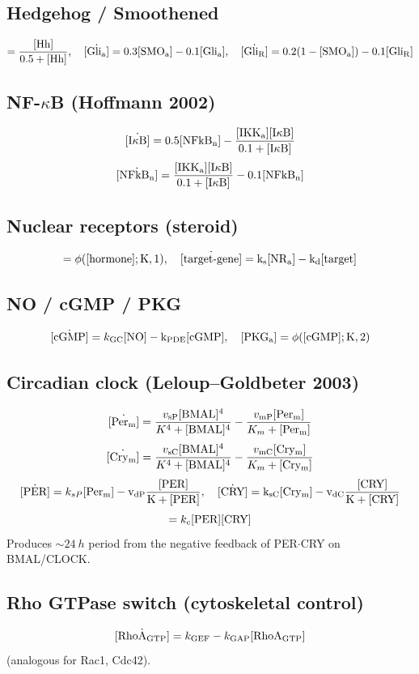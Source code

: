 \documentclass[11pt,a4paper]{article}
\newcommand{\eq}[1]{\begin{equation}#1\end{equation}}
\begin{document}
\subsection{Hedgehog / Smoothened}
\eq{ [\rm SMO_a]=\frac{[\rm Hh]}{0.5+[\rm Hh]},\quad \dot{[\rm Gli_a]}=0.3[\rm SMO_a]-0.1[\rm Gli_a],\quad \dot{[\rm Gli_R]}=0.2(1-[\rm SMO_a])-0.1[\rm Gli_R] }

\subsection{NF-$\kappa$B (Hoffmann 2002)}
\eq{ \dot{[\rm I\kappa B]}=0.5[\rm NFkB_n] - \frac{[\rm IKK_a][\rm I\kappa B]}{0.1+[\rm I\kappa B]} }
\eq{ \dot{[\rm NFkB_n]}=\frac{[\rm IKK_a][\rm I\kappa B]}{0.1+[\rm I\kappa B]} - 0.1[\rm NFkB_n] }

\subsection{Nuclear receptors (steroid)}
\eq{ [\rm NR_a]=\phi([\rm hormone]; K, 1),\quad \dot{[\rm target\text{-}gene]}=k_{\rm s}[\rm NR_a]-k_{\rm d}[\rm target] }

\subsection{NO / cGMP / PKG}
\eq{ \dot{[\rm cGMP]}=k_{\rm GC}[\rm NO]-k_{\rm PDE}[\rm cGMP],\quad [\rm PKG_a]=\phi([\rm cGMP];K,2) }

\subsection{Circadian clock (Leloup--Goldbeter 2003)}
\eq{ \dot{[\rm Per_m]} = \frac{v_{\rm sP}[\rm BMAL]^4}{K^4+[\rm BMAL]^4} - \frac{v_{\rm mP}[\rm Per_m]}{K_m+[\rm Per_m]} }
\eq{ \dot{[\rm Cry_m]} = \frac{v_{\rm sC}[\rm BMAL]^4}{K^4+[\rm BMAL]^4} - \frac{v_{\rm mC}[\rm Cry_m]}{K_m+[\rm Cry_m]} }
\eq{ \dot{[\rm PER]}=k_{sP}[\rm Per_m] - v_{dP}\frac{[\rm PER]}{K+[\rm PER]},\quad \dot{[\rm CRY]}=k_{sC}[\rm Cry_m]-v_{dC}\frac{[\rm CRY]}{K+[\rm CRY]} }
\eq{ [\rm PER\!\cdot\!CRY]=k_c[\rm PER][\rm CRY] }
Produces $\sim\SI{24}{h}$ period from the negative feedback of PER$\cdot$CRY on BMAL/CLOCK.

\subsection{Rho GTPase switch (cytoskeletal control)}
\eq{ \dot{[\rm RhoA_{GTP}]} = k_{\rm GEF} - k_{\rm GAP}[\rm RhoA_{GTP}] }
(analogous for Rac1, Cdc42).
\end{document}
